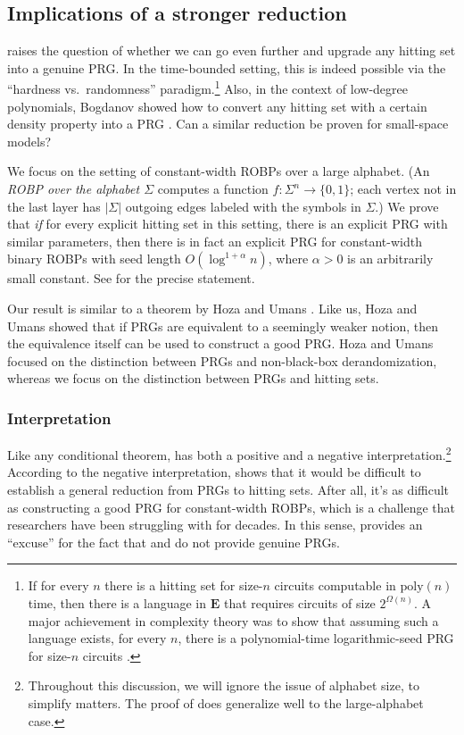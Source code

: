 \documentclass{toc}
\begin{document}
\subsection{Implications of a stronger reduction}
 raises the question of whether we can go even further and upgrade any hitting set into a genuine PRG. In the time-bounded setting, this is indeed possible via the ``hardness vs.\ randomness'' paradigm.\footnote{If for every $n$ there is a hitting set for size-$n$ circuits computable in $\text{poly}(n)$ time, then there is a language in $\mathbf{E}$ that requires circuits of size $2^{\Omega(n)}$. A major achievement in complexity theory was to show that assuming such a language exists, for every $n$, there is a polynomial-time logarithmic-seed PRG for size-$n$ circuits \cite{IW97}.} Also, in the context of low-degree polynomials, Bogdanov showed how to convert any hitting set with a certain density property into a PRG \cite{Bog05}. Can a similar reduction be proven for small-space models?

We focus on the setting of constant-width ROBPs over a large alphabet. (An \emph{ROBP over the alphabet $\Sigma$} computes a function $f \colon \Sigma^n \to \{0, 1\}$; each vertex not in the last layer has $|\Sigma|$ outgoing edges labeled with the symbols in $\Sigma$.) We prove that \emph{if} for every explicit hitting set in this setting, there is an explicit PRG with similar parameters, then there is in fact an explicit PRG for constant-width binary ROBPs with seed length $O(\log^{1 + \alpha} n)$, where $\alpha > 0$ is an arbitrarily small constant. See  for the precise statement.

Our result is similar to a theorem by Hoza and Umans \cite{HU22}. Like us, Hoza and Umans showed that if PRGs are equivalent to a seemingly weaker notion, then the equivalence itself can be used to construct a good PRG. Hoza and Umans focused on the distinction between PRGs and non-black-box derandomization, whereas we focus on the distinction between PRGs and hitting sets.

\subsubsection{Interpretation}
Like any conditional theorem,  has both a positive and a negative interpretation.\footnote{Throughout this discussion, we will ignore the issue of alphabet size, to simplify matters. The proof of  does generalize well to the large-alphabet case.} According to the negative interpretation,  shows that it would be difficult to establish a general reduction from PRGs to hitting sets. After all, it's as difficult as constructing a good PRG for constant-width ROBPs, which is a challenge that researchers have been struggling with for decades. In this sense,  provides an ``excuse'' for the fact that  and  do not provide genuine PRGs.
\end{document}
